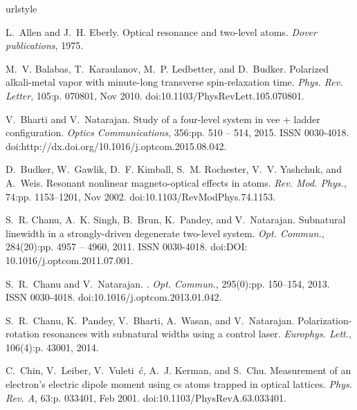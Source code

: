 \begin{thebibliography}{99}
\providecommand{\url}[1]{\texttt{#1}}
\providecommand{\urlprefix}{URL }
\expandafter\ifx\csname urlstyle\endcsname\relax
  \providecommand{\doi}[1]{doi:\discretionary{}{}{}#1}\else
  \providecommand{\doi}{doi:\discretionary{}{}{}\begingroup
  \urlstyle{rm}\Url}\fi

L.~Allen and J.~H. Eberly.
\newblock Optical resonance and two-level atoms.
\newblock \emph{Dover publications}, 1975.

M.~V. Balabas, T.~Karaulanov, M.~P. Ledbetter, and D.~Budker.
\newblock Polarized alkali-metal vapor with minute-long transverse
  spin-relaxation time.
\newblock \emph{Phys. Rev. Letter}, 105:p. 070801, Nov 2010.
\newblock \doi{10.1103/PhysRevLett.105.070801}.

V.~Bharti and V.~Natarajan.
\newblock Study of a four-level system in vee + ladder configuration.
\newblock \emph{Optics Communications}, 356:pp. 510 -- 514, 2015.
\newblock ISSN 0030-4018.
\newblock \doi{http://dx.doi.org/10.1016/j.optcom.2015.08.042}.

D.~Budker, W.~Gawlik, D.~F. Kimball, S.~M. Rochester, V.~V. Yashchuk, and
  A.~Weis.
\newblock Resonant nonlinear magneto-optical effects in atoms.
\newblock \emph{Rev. Mod. Phys.}, 74:pp. 1153--1201, Nov 2002.
\newblock \doi{10.1103/RevModPhys.74.1153}.

S.~R. Chanu, A.~K. Singh, B.~Brun, K.~Pandey, and V.~Natarajan.
\newblock Subnatural linewidth in a strongly-driven degenerate two-level
  system.
\newblock \emph{Opt. Commun.}, 284(20):pp. 4957 -- 4960, 2011.
\newblock ISSN 0030-4018.
\newblock \doi{DOI: 10.1016/j.optcom.2011.07.001}.

S.~R.~Chanu and V.~Natarajan.
.
\newblock \emph{Opt. Commun.}, 295(0):pp. 150--154, 2013.
\newblock ISSN 0030-4018.
\newblock \doi{10.1016/j.optcom.2013.01.042}.

S.~R.~Chanu, K.~Pandey, V.~Bharti, A.~Wasan, and V.~Natarajan. 
\newblock Polarization-rotation resonances with subnatural widths using a control laser.
\newblock \emph{Europhys. Lett.}, 106(4):p. 43001, 2014.

C.~Chin, V.~Leiber, V.~Vuleti\ifmmode~\else \'{c}\fi{}, A.~J. Kerman,
  and S.~Chu.
\newblock Measurement of an electron's electric dipole moment using cs atoms
  trapped in optical lattices.
\newblock \emph{Phys. Rev. A}, 63:p. 033401, Feb 2001.
\newblock \doi{10.1103/PhysRevA.63.033401}.


\end{thebibliography}
